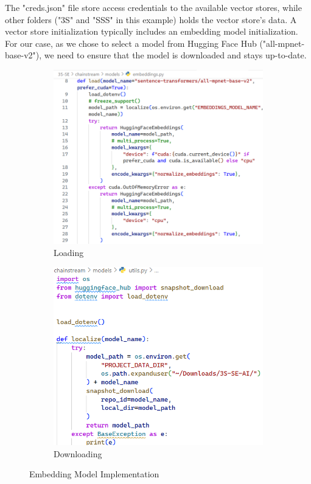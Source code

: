 The "creds.json" file store access credentials to the available vector stores, while other folders ("3S" and "SSS" in this example) holds the vector store's data.\smallbreak
A vector store initialization typically includes an embedding model initialization. For our case, as we chose to select a model from Hugging Face Hub ("all-mpnet-base-v2"), we need to ensure that the model is downloaded and stays up-to-date.
\begin{figure}[htbp]
    \centering
    \begin{subfigure}{0.45\textwidth}
        \centering
        \includegraphics[width=\linewidth]{./figures/embedding-model-loading.png}
        \caption{Loading}
    \end{subfigure}
    \hfill
    \begin{subfigure}{0.45\textwidth}
        \centering
        \includegraphics[width=\linewidth]{./figures/embedding-model-downloading.png}
        \caption{Downloading}
    \end{subfigure}
    \caption{Embedding Model Implementation}
\end{figure}\newline
